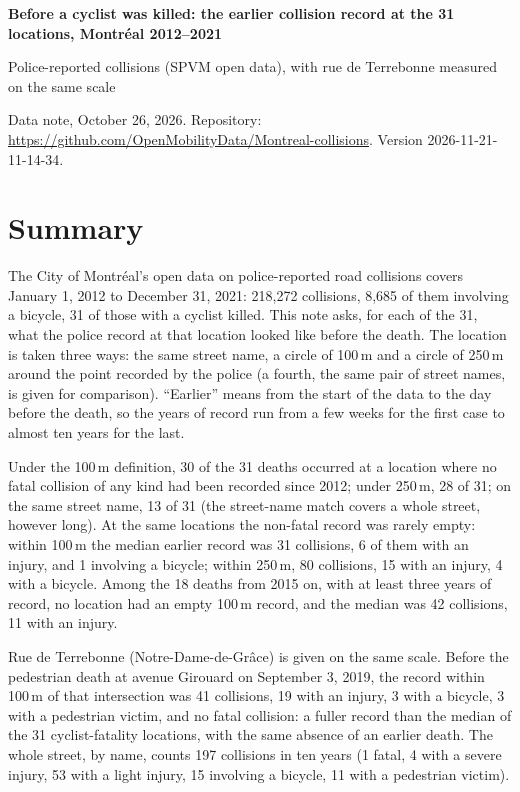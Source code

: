 \documentclass[11pt,letterpaper]{article}
\newcommand{\docversion}{2026-11-21-11-14-34} %
\newcommand{\repourl}{https://github.com/OpenMobilityData/Montreal-collisions}
\newcommand{\repo}[1]{\href{\repourl}{#1}}
\begin{document}
{\LARGE\bfseries Before a cyclist was killed: the earlier collision record at the 31 locations, Montréal 2012--2021}

{\large Police-reported collisions (SPVM open data), with rue de Terrebonne measured on the same scale}

\medskip
Data note, October 26, 2026. Repository: \repo{\repourl}. Version \docversion.

\section*{Summary}

The City of Montréal's open data on police-reported road collisions covers January 1, 2012 to December 31, 2021: 218,272 collisions, 8,685 of them involving a bicycle, 31 of those with a cyclist killed. This note asks, for each of the 31, what the police record at that location looked like before the death. The location is taken three ways: the same street name, a circle of 100\,m and a circle of 250\,m around the point recorded by the police (a fourth, the same pair of street names, is given for comparison). ``Earlier'' means from the start of the data to the day before the death, so the years of record run from a few weeks for the first case to almost ten years for the last.

Under the 100\,m definition, 30 of the 31 deaths occurred at a location where no fatal collision of any kind had been recorded since 2012; under 250\,m, 28 of 31; on the same street name, 13 of 31 (the street-name match covers a whole street, however long). At the same locations the non-fatal record was rarely empty: within 100\,m the median earlier record was 31 collisions, 6 of them with an injury, and 1 involving a bicycle; within 250\,m, 80 collisions, 15 with an injury, 4 with a bicycle. Among the 18 deaths from 2015 on, with at least three years of record, no location had an empty 100\,m record, and the median was 42 collisions, 11 with an injury.

Rue de Terrebonne (Notre-Dame-de-Grâce) is given on the same scale. Before the pedestrian death at avenue Girouard on September 3, 2019, the record within 100\,m of that intersection was 41 collisions, 19 with an injury, 3 with a bicycle, 3 with a pedestrian victim, and no fatal collision: a fuller record than the median of the 31 cyclist-fatality locations, with the same absence of an earlier death. The whole street, by name, counts 197 collisions in ten years (1 fatal, 4 with a severe injury, 53 with a light injury, 15 involving a bicycle, 11 with a pedestrian victim).
\end{document}
